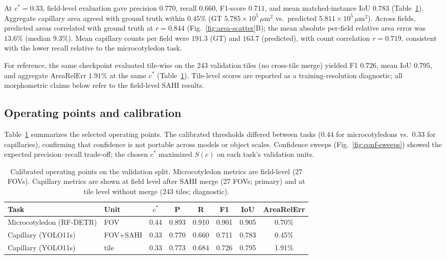 At $c^{*}=0.33$, field-level evaluation gave precision $0.770$, recall $0.660$, F1-score $0.711$, and mean matched-instance IoU $0.783$ (Table~\ref{tab:operating-points}). Aggregate capillary area agreed with ground truth within $0.45\%$ (GT $5.785\times10^{5}\,\mu\mathrm{m}^{2}$ vs.\ predicted $5.811\times10^{5}\,\mu\mathrm{m}^{2}$). Across fields, predicted areas correlated with ground truth at $r=0.844$ (Fig.~\ref{fig:area-scatter}B); the mean absolute per-field relative area error was $13.6\%$ (median $9.3\%$). Mean capillary counts per field were $191.3$ (GT) and $163.7$ (predicted), with count correlation $r=0.719$, consistent with the lower recall relative to the microcotyledon task.

For reference, the same checkpoint evaluated tile-wise on the 243 validation tiles (no cross-tile merge) yielded F1 $0.726$, mean IoU $0.795$, and aggregate AreaRelErr $1.91\%$ at the same $c^{*}$ (Table~\ref{tab:operating-points}). Tile-level scores are reported as a training-resolution diagnostic; all morphometric claims below refer to the field-level SAHI results.

\subsection{Operating points and calibration}

Table~\ref{tab:operating-points} summarizes the selected operating points. The calibrated thresholds differed between tasks ($0.44$ for microcotyledons vs.\ $0.33$ for capillaries), confirming that confidence is not portable across models or object scales. Confidence sweeps (Fig.~\ref{fig:conf-sweeps}) showed the expected precision--recall trade-off; the chosen $c^{*}$ maximized $S(c)$ on each task's validation units.

\begin{table}[H]
\centering
\caption{Calibrated operating points on the validation split.
Microcotyledon metrics are field-level (27 FOVs).
Capillary metrics are shown at field level after SAHI merge (27 FOVs; primary)
and at tile level without merge (243 tiles; diagnostic).}
\label{tab:operating-points}
\begin{tabular}{llcccccc}
\hline
Task & Unit & $c^{*}$ & P & R & F1 & IoU & AreaRelErr \\
\hline
Microcotyledon (RF-DETR) & FOV & 0.44 & 0.893 & 0.910 & 0.901 & 0.905 & 0.70\% \\
Capillary (YOLO11s) & FOV+SAHI & 0.33 & 0.770 & 0.660 & 0.711 & 0.783 & 0.45\% \\
Capillary (YOLO11s) & tile & 0.33 & 0.773 & 0.684 & 0.726 & 0.795 & 1.91\% \\
\hline
\end{tabular}
\end{table}

